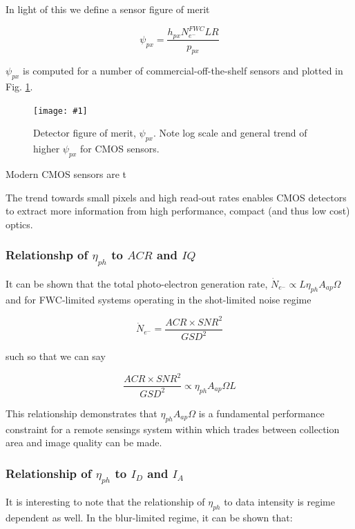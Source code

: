 \documentclass[10pt,journal]{IEEEtran}  %
\newcommand{\includefigure}[3]
{
  \begin{figure}[h!]
  \centering
  \texttt{[image: \#1]}
  \caption[]{#3}
  \label{#2}
  \end{figure}
}
\begin{document}
In light of this we define a sensor figure of merit

\begin{equation}
    \psi_{px} = \frac{h_{px}N_{e^-}^{FWC}LR}{p_{px}}
\end{equation}

$\psi_{px}$ is computed for a number of commercial-off-the-shelf sensors and plotted in Fig. \ref{fig:psi_px}.

\includefigure{figures/p_kpi.pgf}{fig:psi_px}{Detector figure of merit, $\psi_{px}$.  Note log scale and general trend of higher $\psi_{px}$ for CMOS sensors.}

Modern CMOS sensors are t

\begin{observation}
The trend towards small pixels and high read-out rates enables CMOS detectors to extract more information from high performance, compact (and thus low cost) optics.
\end{observation}

\subsubsection{Relationshp of $\eta_{ph}$ to $ACR$ and $IQ$}

It can be shown that the total photo-electron generation rate, $\dot{N}_{e^-} \propto L\eta_{ph}A_{ap}\Omega$ and for FWC-limited systems operating in the shot-limited noise regime

\begin{equation}
    \dot{N}_{e^-} = \frac{ACR \times SNR^2}{GSD^2}
\end{equation}

such so that we can say

\begin{equation}
    \frac{ACR \times SNR^2}{GSD^2} \propto \eta_{ph} A_{ap}\Omega L
\end{equation}

This relationship demonstrates that $\eta_{ph}A_{ap}\Omega$ is a fundamental performance constraint for a remote sensings system within which trades between collection area and image quality can be made.

\subsubsection{Relationship of $\eta_{ph}$ to $I_{D}$ and $I_A$}

It is interesting to note that the relationship of $\eta_{ph}$ to data intensity is regime dependent as well.  In the blur-limited regime, it can be shown that:
\end{document}
